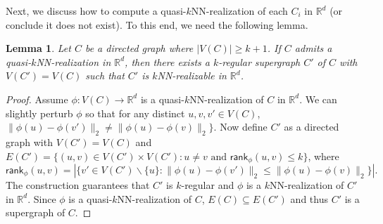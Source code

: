\documentclass[11pt]{article}
\newtheorem{lemma}{Lemma}
\begin{document}
Next, we discuss how to compute a quasi-$k$NN-realization of each $C_i$ in $\mathbb{R}^d$ (or conclude it does not exist).
To this end, we need the following lemma.

\begin{lemma}
Let $C$ be a directed graph where $|V(C)| \geq k+1$.
If $C$ admits a quasi-$k$NN-realization in $\mathbb{R}^d$, then there exists a $k$-regular supergraph $C'$ of $C$ with $V(C') = V(C)$ such that $C'$ is $k$NN-realizable in $\mathbb{R}^d$.
\end{lemma}
\begin{proof}
Assume $\phi: V(C) \rightarrow \mathbb{R}^d$ is a quasi-$k$NN-realization of $C$ in $\mathbb{R}^d$.
We can slightly perturb $\phi$ so that for any distinct $u,v,v' \in V(C)$, $\lVert \phi(u) - \phi(v') \rVert_2 \neq \lVert \phi(u) - \phi(v) \rVert_2\}$.
Now define $C'$ as a directed graph with $V(C') = V(C)$ and $E(C') = \{(u,v) \in V(C') \times V(C'): u \neq v \text{ and } \mathsf{rank}_\phi(u,v) \leq k\}$, where 
\begin{equation*}
    \mathsf{rank}_\phi(u,v) = |\{v' \in V(C') \backslash \{u\}: \lVert \phi(u) - \phi(v') \rVert_2 \leq \lVert \phi(u) - \phi(v) \rVert_2\}|.
\end{equation*}
The construction guarantees that $C'$ is $k$-regular and $\phi$ is a $k$NN-realization of $C'$ in $\mathbb{R}^d$.
Since $\phi$ is a quasi-$k$NN-realization of $C$, $E(C) \subseteq E(C')$ and thus $C'$ is a supergraph of $C$.
\end{proof}
\end{document}
